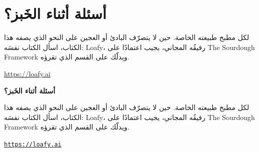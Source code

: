 %
%

\ifdefined\HCode
\chapter*{أسئلة أثناء الخَبز؟}
لكل مطبخ طبيعته الخاصة. حين لا يتصرّف البادئ أو العجين على النحو الذي يصفه
هذا الكتاب، اسأل الكتاب نفسَه: \textenglish{Loafy}، رفيقُه المجاني، يجيب
اعتمادًا على \textenglish{The Sourdough Framework} ويدلّك على القسم الذي
تقرؤه.

\href{https://loafy.ai/loafy?via=tsf-epub-end}{https://loafy.ai}
\else
\clearpage
\thispagestyle{empty}
\vspace*{0.22\textheight}
\begin{center}
{\LARGE\bfseries أسئلة أثناء الخَبز؟}\par
\bigskip
\begin{minipage}{0.72\textwidth}
\centering
لكل مطبخ طبيعته الخاصة. حين لا يتصرّف البادئ أو العجين على النحو الذي يصفه
هذا الكتاب، اسأل الكتاب نفسَه: \textenglish{Loafy}، رفيقُه المجاني، يجيب
اعتمادًا على \textenglish{The Sourdough Framework} ويدلّك على القسم الذي
تقرؤه.\par
\medskip
\href{https://loafy.ai/loafy?via=tsf-pdf-end}{\nolinkurl{https://loafy.ai}}
\end{minipage}\par
\bigskip\bigskip
\end{center}
\fi
